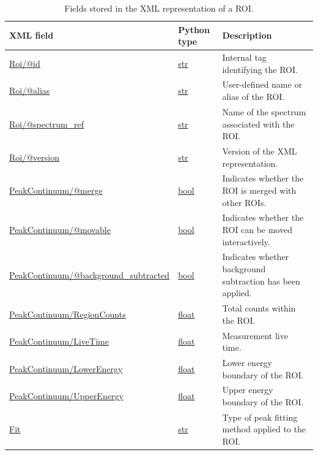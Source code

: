 \begin{table}[H]
    \centering
    \caption{Fields stored in the XML representation of a ROI.}
    \label{tab:roi-xml-fields}
    \begin{tabular}{p{} p{} p{}}
    \toprule
    \textbf{XML field} & \textbf{Python type} & \textbf{Description} \\ \midrule

    \url{Roi/@id}
        & \url{str}
        & Internal tag identifying the ROI. \\

    \url{Roi/@alias}
        & \url{str}
        & User-defined name or alias of the ROI. \\

    \url{Roi/@spectrum\_ref}
        & \url{str}
        & Name of the spectrum associated with the ROI. \\

    \url{Roi/@version}
        & \url{str}
        & Version of the XML representation. \\

    \url{PeakContinuum/@merge}
        & \url{bool}
        & Indicates whether the ROI is merged with other ROIs. \\

    \url{PeakContinuum/@movable}
        & \url{bool}
        & Indicates whether the ROI can be moved interactively. \\

    \url{PeakContinuum/@background\_subtracted}
        & \url{bool}
        & Indicates whether background subtraction has been applied. \\

    \url{PeakContinuum/RegionCounts}
        & \url{float}
        & Total counts within the ROI. \\

    \url{PeakContinuum/LiveTime}
        & \url{float}
        & Measurement live time. \\

    \url{PeakContinuum/LowerEnergy}
        & \url{float}
        & Lower energy boundary of the ROI. \\

    \url{PeakContinuum/UpperEnergy}
        & \url{float}
        & Upper energy boundary of the ROI. \\

    \url{Fit}
        & \url{str}
        & Type of peak fitting method applied to the ROI. \\


\end{tabular}
\end{table}

